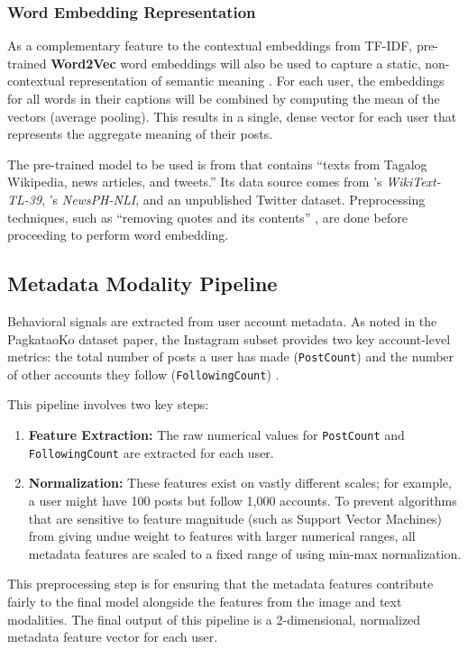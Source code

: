 \subsubsection{Word Embedding Representation}
As a complementary feature to the contextual embeddings from TF-IDF, pre-trained \textbf{Word2Vec} word embeddings will also be used to capture a static, non-contextual representation of semantic meaning \citep{Mikolov_Sutskever_Chen_Corrado_Dean_2013}. For each user, the embeddings for all words in their captions will be combined by computing the mean of the vectors (average pooling). This results in a single, dense vector for each user that represents the aggregate meaning of their posts.


The pre-trained model to be used is from \citet{velasco2021filwembs} that contains “texts from Tagalog Wikipedia, news articles, and tweets.” Its data source comes from \citet{Cruz_Cheng_2019}’s \textit{WikiText-TL-39}, \citet{Cruz_Resabal_Lin_Velasco_Cheng_2021}’s \textit{NewsPH-NLI}, and an unpublished Twitter dataset. Preprocessing techniques, such as “removing quotes and its contents” \citet{velasco2021filwembs}, are done before proceeding to perform word embedding.


\subsection{Metadata Modality Pipeline}
Behavioral signals are extracted from user account metadata. As noted in the PagkataoKo dataset paper, the Instagram subset provides two key account-level metrics: the total number of posts a user has made (\texttt{PostCount}) and the number of other accounts they follow (\texttt{FollowingCount}) \citep{tighe_acorda_2022}.

This pipeline involves two key steps:
\begin{enumerate}
	\item \textbf{Feature Extraction:} The raw numerical values for \texttt{PostCount} and \texttt{FollowingCount} are extracted for each user.
	\item \textbf{Normalization:} These features exist on vastly different scales; for example, a user might have 100 posts but follow 1,000 accounts. To prevent algorithms that are sensitive to feature magnitude (such as Support Vector Machines) from giving undue weight to features with larger numerical ranges, all metadata features are scaled to a fixed range of  using min-max normalization.
\end{enumerate}
This preprocessing step is for ensuring that the metadata features contribute fairly to the final model alongside the features from the image and text modalities. The final output of this pipeline is a 2-dimensional, normalized metadata feature vector for each user.

